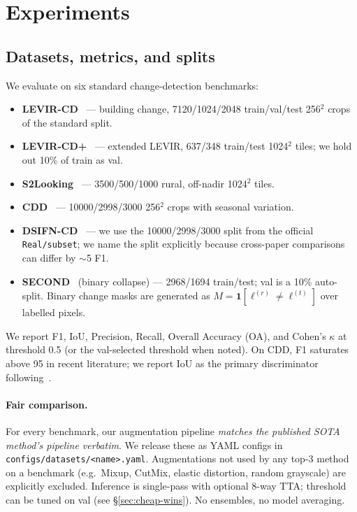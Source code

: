 \section{Experiments}
\label{sec:experiments}

\subsection{Datasets, metrics, and splits}

We evaluate on six standard change-detection benchmarks:

\begin{itemize}
  \item \textbf{LEVIR-CD}~\citep{chen2020spatial} --- building change,
    7120/1024/2048 train/val/test 256$^2$ crops of the standard split.
  \item \textbf{LEVIR-CD+}~\citep{zheng2022changestar} --- extended LEVIR,
    637/348 train/test 1024$^2$ tiles; we hold out 10\% of train as val.
  \item \textbf{S2Looking}~\citep{shen2021s2looking} --- 3500/500/1000
    rural, off-nadir 1024$^2$ tiles.
  \item \textbf{CDD}~\citep{lebedev2018change} --- 10000/2998/3000 256$^2$
    crops with seasonal variation.
  \item \textbf{DSIFN-CD}~\citep{zhang2020deeply} --- we use the
    10000/2998/3000 split from the official \texttt{Real/subset}; we name
    the split explicitly because cross-paper comparisons can differ by
    $\sim$5 F1.
  \item \textbf{SECOND}~\citep{yang2021second} (binary collapse) ---
    2968/1694 train/test; val is a 10\% auto-split. Binary change masks are
    generated as $M = \mathbf{1}[\ell^{(r)} \ne \ell^{(t)}]$ over labelled
    pixels.
\end{itemize}

We report F1, IoU, Precision, Recall, Overall Accuracy (OA), and Cohen's
$\kappa$ at threshold 0.5 (or the val-selected threshold when noted). On
CDD, F1 saturates above 95 in recent literature; we report IoU as the
primary discriminator following~\citep{corley2024reality}.

\paragraph{Fair comparison.} For every benchmark, our augmentation
pipeline \emph{matches the published SOTA method's pipeline verbatim}. We
release these as YAML configs in \texttt{configs/datasets/<name>.yaml}.
Augmentations not used by any top-3 method on a benchmark (e.g.\ Mixup,
CutMix, elastic distortion, random grayscale) are explicitly excluded.
Inference is single-pass with optional 8-way TTA; threshold can be tuned
on val (see \S\ref{sec:cheap-wins}). No ensembles, no model averaging.

